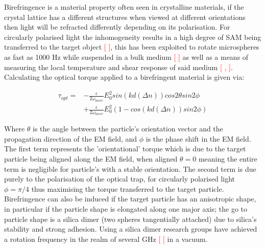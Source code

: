 Birefringence is a material property often seen in crystalline materials, if the crystal lattice has a different structures when viewed at different orientations then light will be refracted differently depending on its polarisation. For circularly polarised light the inhomogeneity results in a high degree of SAM being transferred to the target object \textcolor{red}{[ ]}, this has been exploited to rotate microspheres as fast as 1000 Hz while suspended in a bulk medium \textcolor{red}{[ ]} as well as a means of measuring the local temperature and shear response of said medium \textcolor{red}{[ , ]}. Calculating the optical torque applied to a birefringent material is given via:

\begin{equation}
	\label{eq:opt_torque}
	\begin{aligned}
		\tau_{opt} =& -\frac{\epsilon}{2\omega_{laser}}E_0^2sin(kd(\Delta n))cos2\theta sin2\phi \\ &+  \frac{\epsilon}{2\omega_{laser}}E_0^2 (1-cos(kd(\Delta n))sin2\phi)
	\end{aligned}
\end{equation}

Where $\theta$ is the angle between the particle's orientation vector and the propagation direction of the EM field, and $\phi$ is the phase shift in the EM field.  The first term represents the 'orientational' torque which is due to the target particle being aligned along the EM field, when aligned $\theta=0$ meaning the entire term is negligible for particle's with a stable orientation. The second term is due purely to the polarisation of the optical trap, for circularly polarised light $\phi=\pi/4$ thus maximising the torque transferred to the target particle. Birefringence can also be induced if the target particle has an anisotropic shape, in particular if the particle shape is elongated along one major axis; the go to particle shape is a silica dimer (two spheres tangentially attached) due to silica's stability and strong adhesion. Using a silica dimer research groups have achieved a rotation frequency in the realm of several GHz \textcolor{red}{[ ]} in a vacuum. 